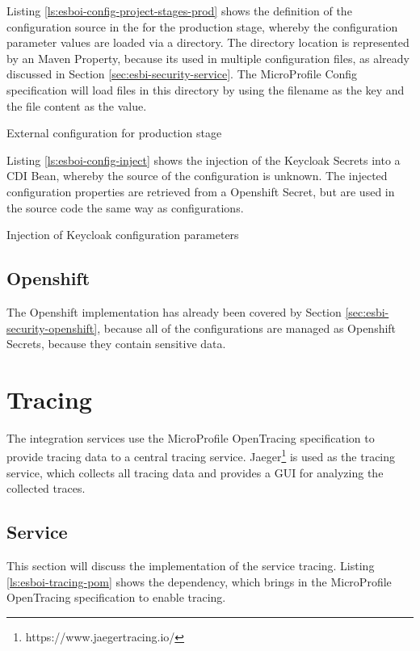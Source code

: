 Listing \vref{ls:esboi-config-project-stages-prod} shows the definition of the configuration source in the  for the production stage, whereby the configuration parameter values are loaded via a directory. The directory location is represented by an Maven Property, because its used in multiple configuration files, as already discussed in Section \vref{sec:esbi-security-service}. The MicroProfile Config specification will load files in this directory by using the filename as the key and the file content as the value.

\begin{listing}[h]
	\caption{External configuration for production stage}
	\label{ls:esboi-config-project-stages-prod}
\end{listing}

Listing \vref{ls:esboi-config-inject} shows the injection of the Keycloak Secrets into a CDI Bean, whereby the source of the configuration is unknown. The injected configuration properties are retrieved from a Openshift Secret, but are used in the source code the same way as configurations.

\begin{listing}[h]
	\caption{Injection of Keycloak configuration parameters}
	\label{ls:esboi-config-inject}
\end{listing}

\subsection{Openshift}
\label{sec:esbi-config-openshift}
The Openshift implementation has already been covered by Section \vref{sec:esbi-security-openshift}, because all of the configurations are managed as Openshift Secrets, because they contain sensitive data. 

\section{Tracing}
\label{sec:esbi-tracing}
The integration services use the MicroProfile OpenTracing specification to provide tracing data to a central tracing service. Jaeger\footnote{https://www.jaegertracing.io/} is used as the tracing service, which collects all tracing data and provides a GUI for analyzing the collected traces. 

\subsection{Service}
\label{sec:esbi-tracing-service}
This section will discuss the implementation of the service tracing. Listing \vref{ls:esboi-tracing-pom} shows the dependency, which brings in the MicroProfile OpenTracing specification to enable tracing. 

